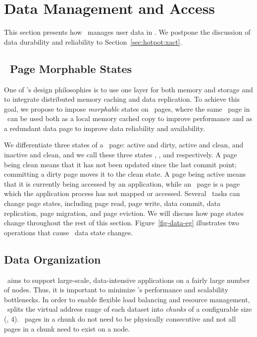 \section{Data Management and Access}
\label{sec:hotpot:data}

This section presents how \hotpot\ manages user data in \dsnvm. 
We postpone the discussion of data durability and reliability to Section~\ref{sec:hotpot:xact}.

\subsection{\nvm\ Page Morphable States}
One of \hotpot's design philosophies is to use one layer for both memory and storage 
and to integrate distributed memory caching and data replication.
To achieve this goal, we propose to impose {\em morphable} states on \nvm\ pages,
where the same \nvm\ page in \hotpot\ can be used both as a local memory cached copy to improve performance
and as a redundant data page to improve data reliability and availability.

We differentiate three states of a \nvm\ page:
active and dirty, active and clean, and inactive and clean,
and we call these three states {\em \dirty}, {\em \committed}, and {\em \redundant} respectively.
A page being clean means that it has not been updated since the last commit point;
committing a dirty page moves it to the clean state.
A page being active means that it is currently being accessed by an application,
while an \redundant\ page is a page which the application process has not mapped or accessed.
Several \hotpot\ tasks can change page states,
including page read, page write, data commit, data replication, page migration, and page eviction.
We will discuss how page states change throughout the rest of this section.
Figure~\ref{fig-data-eg} illustrates two operations that cause \hotpot\ data state changes.

\subsection{Data Organization}
\hotpot\ aims to support large-scale, data-intensive applications
on a fairly large number of nodes. %
Thus, it is important to minimize \hotpot's performance and scalability bottlenecks.
In order to enable flexible load balancing and resource management,
\hotpot\ splits the virtual address range of each dataset 
into {\em chunks} of a configurable size (\eg, 4\MB).
\nvm\ pages in a chunk do not need to be physically consecutive
and not all pages in a chunk need to exist on a node.


